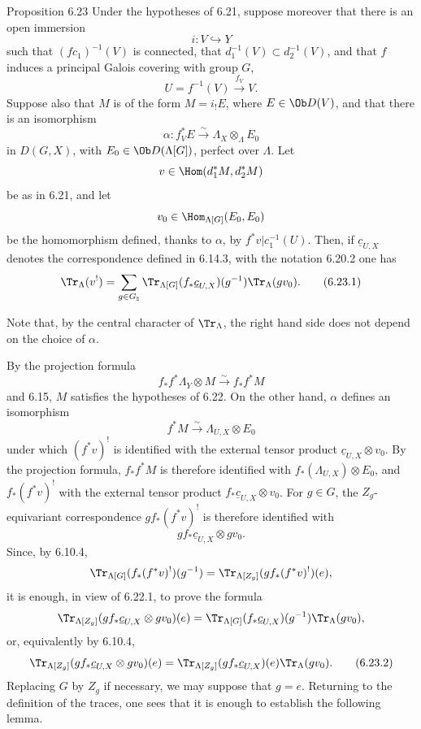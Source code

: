 \begin{statement}{Proposition 6.23}
Under the hypotheses of 6.21, suppose moreover that there is an open immersion
\[
i:V\hookrightarrow Y
\]
such that $(fc_1)^{-1}(V)$ is connected, that $d_1^{-1}(V)\subset d_2^{-1}(V)$, and that $f$ induces a principal Galois covering with group $G$,
\[
U=f^{-1}(V)\xrightarrow{f_V}V.
\]
Suppose also that $M$ is of the form $M=i_!E$, where $E\in\Ob D(V)$, and that there is an isomorphism
\[
\alpha:f_V^*E\xrightarrow{\sim}\Lambda_X\otimes_{\Lambda}E_0
\]
in $D(G,X)$, with $E_0\in\Ob D(\Lambda[G])$, perfect over $\Lambda$. Let
\[
v\in\Hom(d_1^*M,d_2^*M)
\]
be as in 6.21, and let
\[
v_0\in\Hom_{\Lambda[G]}(E_0,E_0)
\]
be the homomorphism defined, thanks to $\alpha$, by $f^*v|c_1^{-1}(U)$. Then, if $\underline c_{U,X}$ denotes the correspondence defined in 6.14.3, with the notation 6.20.2 one has
\begin{equation}
\Tr_{\Lambda}(v^!)
=
\sum_{g\in G_{\natural}}
\Tr_{\Lambda[G]}(f_*\underline c_{U,X})(g^{-1})\Tr_{\Lambda}(gv_0).
\tag{6.23.1}
\end{equation}
\end{statement}

Note that, by the central character of $\Tr_{\Lambda}$, the right hand side does not depend on the choice of $\alpha$.

By the projection formula
\[
f_*f^*\Lambda_Y\otimes M\xrightarrow{\sim}f_*f^*M
\]
and 6.15, $M$ satisfies the hypotheses of 6.22. On the other hand, $\alpha$ defines an isomorphism
\[
f^*M\xrightarrow{\sim}\Lambda_{U,X}\otimes E_0
\]
under which $(f^*v)^!$ is identified with the external tensor product $\underline c_{U,X}\otimes v_0$. By the projection formula, $f_*f^*M$ is therefore identified with $f_*(\Lambda_{U,X})\otimes E_0$, and $f_*(f^*v)^!$ with the external tensor product $f_*\underline c_{U,X}\otimes v_0$. For $g\in G$, the $Z_g$-equivariant correspondence $gf_*(f^*v)^!$ is therefore identified with
\[
gf_*\underline c_{U,X}\otimes gv_0.
\]
Since, by 6.10.4,
\[
\Tr_{\Lambda[G]}(f_*(f^*v)^!)(g^{-1})
=
\Tr_{\Lambda[Z_g]}(gf_*(f^*v)^!)(e),
\]
it is enough, in view of 6.22.1, to prove the formula
\[
\Tr_{\Lambda[Z_g]}(gf_*\underline c_{U,X}\otimes gv_0)(e)
=
\Tr_{\Lambda[G]}(f_*\underline c_{U,X})(g^{-1})\Tr_{\Lambda}(gv_0),
\]
or, equivalently by 6.10.4,
\begin{equation}
\Tr_{\Lambda[Z_g]}(gf_*\underline c_{U,X}\otimes gv_0)(e)
=
\Tr_{\Lambda[Z_g]}(gf_*\underline c_{U,X})(e)\Tr_{\Lambda}(gv_0).
\tag{6.23.2}
\end{equation}
Replacing $G$ by $Z_g$ if necessary, we may suppose that $g=e$. Returning to the definition of the traces, one sees that it is enough to establish the following lemma.

